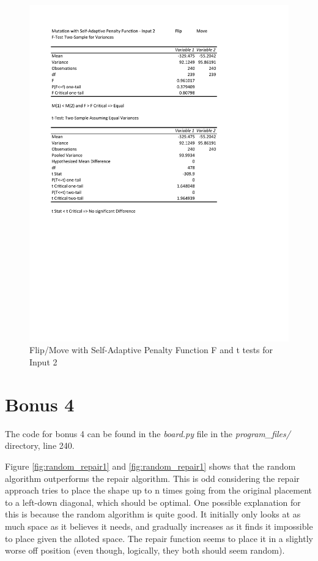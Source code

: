 \documentclass[times]{article}
\begin{document}
	\begin{figure}
		\caption{Flip/Move with Self-Adaptive Penalty Function F and t tests for Input 2}
		\label{fig:flip_move_sa_penalty2}
		\includegraphics[width=\textwidth]{./t_test/mutation_sa_penalty2}
	\end{figure}



	\section{Bonus 4}
	The code for bonus 4 can be found in the \textit{board.py} file in the \textit{program\_files/} directory, line 240.

	Figure \ref{fig:random_repair1} and \ref{fig:random_repair1} shows that the random algorithm outperforms the repair algorithm. This is odd considering the repair approach tries to place the shape up to n times going from the original placement to a left-down diagonal, which should be optimal. One possible explanation for this is because the random algorithm is quite good. It initially only looks at as much space as it believes it needs, and gradually increases as it finds it impossible to place given the alloted space. The repair function seems to place it in a slightly worse off position (even though, logically, they both should seem random).
\end{document}
